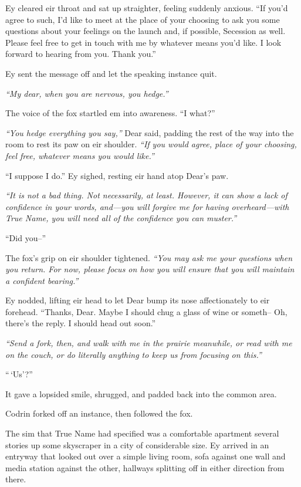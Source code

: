 Ey cleared eir throat and sat up straighter, feeling suddenly anxious. ``If you'd agree to such, I'd like to meet at the place of your choosing to ask you some questions about your feelings on the launch and, if possible, Secession as well. Please feel free to get in touch with me by whatever means you'd like. I look forward to hearing from you. Thank you.''

Ey sent the message off and let the speaking instance quit.

\emph{``My dear, when you are nervous, you hedge.''}

The voice of the fox startled em into awareness. ``I what?''

\emph{``You hedge everything you say,''} Dear said, padding the rest of the way into the room to rest its paw on eir shoulder. \emph{``If you would agree, place of your choosing, feel free, whatever means you would like.''}

``I suppose I do.'' Ey sighed, resting eir hand atop Dear's paw.

\emph{``It is not a bad thing. Not necessarily, at least. However, it can show a lack of confidence in your words, and---you will forgive me for having overheard---with True Name, you will need all of the confidence you can muster.''}

``Did you--''

The fox's grip on eir shoulder tightened. \emph{``You may ask me your questions when you return. For now, please focus on how you will ensure that you will maintain a confident bearing.''}

Ey nodded, lifting eir head to let Dear bump its nose affectionately to eir forehead. ``Thanks, Dear. Maybe I should chug a glass of wine or someth-- Oh, there's the reply. I should head out soon.''

\emph{``Send a fork, then, and walk with me in the prairie meanwhile, or read with me on the couch, or do literally anything to keep us from focusing on this.''}

``\,`Us'?''

It gave a lopsided smile, shrugged, and padded back into the common area.

Codrin forked off an instance, then followed the fox.

The sim that True Name had specified was a comfortable apartment several stories up some skyscraper in a city of considerable size. Ey arrived in an entryway that looked out over a simple living room, sofa against one wall and media station against the other, hallways splitting off in either direction from there.

